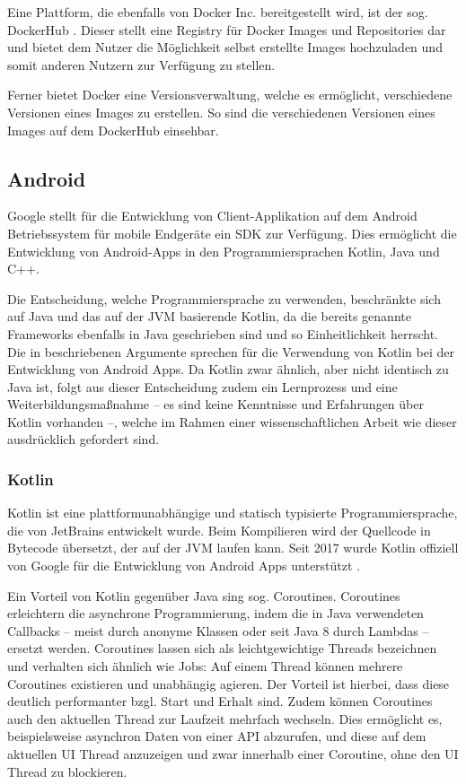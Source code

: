 				Eine Plattform, die ebenfalls von Docker Inc. bereitgestellt wird, ist der sog. DockerHub \cite{DockerInc..3232020}. Dieser stellt eine Registry für Docker Images und Repositories dar und bietet dem Nutzer die Möglichkeit selbst erstellte Images hochzuladen und somit anderen Nutzern zur Verfügung zu stellen. 
				
				Ferner bietet Docker eine Versionsverwaltung, welche es ermöglicht, verschiedene Versionen eines Images zu erstellen. So sind die verschiedenen Versionen eines Images auf dem DockerHub einsehbar.
		
		\subsection{Android} %
	
			Google stellt für die Entwicklung von Client-Applikation auf dem Android Betriebssystem für mobile Endgeräte ein \ac{SDK} \cite{Google.3192020} zur Verfügung. Dies ermöglicht die Entwicklung von Android-Apps in den Programmiersprachen Kotlin, Java und C++. 
			
			Die Entscheidung, welche Programmiersprache zu verwenden, beschränkte sich auf Java und das auf der \ac{JVM} basierende Kotlin, da die bereits genannte Frameworks ebenfalls in Java geschrieben sind und so Einheitlichkeit herrscht. Die in \cite{Dossey.2019} beschriebenen Argumente sprechen für die Verwendung von Kotlin bei der Entwicklung von Android Apps. Da Kotlin zwar ähnlich, aber nicht identisch zu Java ist, folgt aus dieser Entscheidung zudem ein Lernprozess und eine Weiterbildungsmaßnahme -- es sind keine Kenntnisse und Erfahrungen über Kotlin vorhanden --, welche im Rahmen einer wissenschaftlichen Arbeit wie dieser ausdrücklich gefordert sind.
		
			\subsubsection{Kotlin} %
			
				Kotlin ist eine plattformunabhängige und statisch typisierte Programmiersprache, die von JetBrains entwickelt wurde. Beim Kompilieren wird der Quellcode in Bytecode übersetzt, der auf der \acs{JVM} laufen kann. Seit 2017 wurde Kotlin offiziell von Google für die Entwicklung von Android Apps unterstützt \cite{JetBrains.2017}. 
				
				Ein Vorteil von Kotlin gegenüber Java sing sog. Coroutines. Coroutines erleichtern die asynchrone Programmierung, indem die in Java verwendeten Callbacks -- meist durch anonyme Klassen oder seit Java 8 durch Lambdas -- ersetzt werden. Coroutines lassen sich als leichtgewichtige Threads bezeichnen und verhalten sich ähnlich wie Jobs: Auf einem Thread können mehrere Coroutines existieren und unabhängig agieren. Der Vorteil ist hierbei, dass diese deutlich performanter bzgl. Start und Erhalt sind. Zudem können Coroutines auch den aktuellen Thread zur Laufzeit mehrfach wechseln. Dies ermöglicht es, beispielsweise asynchron Daten von einer API abzurufen, und diese auf dem aktuellen UI Thread anzuzeigen und zwar innerhalb einer Coroutine, ohne den UI Thread zu blockieren. 
				
